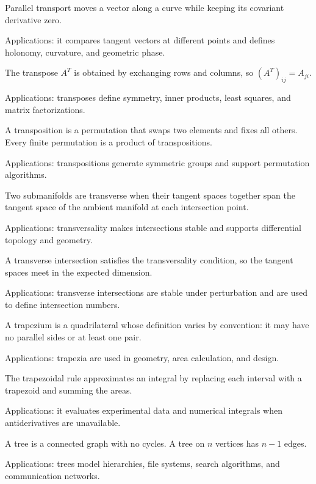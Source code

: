 Parallel transport moves a vector along a curve while keeping its covariant derivative zero. \par\noindent Applications: it compares tangent vectors at different points and defines holonomy, curvature, and geometric phase.

The transpose $A^T$ is obtained by exchanging rows and columns, so $(A^T)_{ij}=A_{ji}$. \par\noindent Applications: transposes define symmetry, inner products, least squares, and matrix factorizations.

A transposition is a permutation that swaps two elements and fixes all others. Every finite permutation is a product of transpositions. \par\noindent Applications: transpositions generate symmetric groups and support permutation algorithms.

Two submanifolds are transverse when their tangent spaces together span the tangent space of the ambient manifold at each intersection point. \par\noindent Applications: transversality makes intersections stable and supports differential topology and geometry.

A transverse intersection satisfies the transversality condition, so the tangent spaces meet in the expected dimension. \par\noindent Applications: transverse intersections are stable under perturbation and are used to define intersection numbers.

A trapezium is a quadrilateral whose definition varies by convention: it may have no parallel sides or at least one pair. \par\noindent Applications: trapezia are used in geometry, area calculation, and design.

The trapezoidal rule approximates an integral by replacing each interval with a trapezoid and summing the areas. \par\noindent Applications: it evaluates experimental data and numerical integrals when antiderivatives are unavailable.

A tree is a connected graph with no cycles. A tree on $n$ vertices has $n-1$ edges. \par\noindent Applications: trees model hierarchies, file systems, search algorithms, and communication networks.

